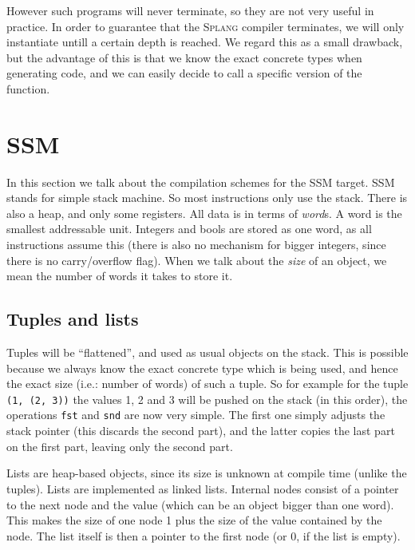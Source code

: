 \documentclass[14pt]{amsart}
\newcommand{\splang}{\textsc{Splang}\xspace}
\begin{document}
However such programs will never terminate, so they are not very useful in practice. In order to guarantee that the \splang compiler terminates, we will only instantiate untill a certain depth is reached. We regard this as a small drawback, but the advantage of this is that we know the exact concrete types when generating code, and we can easily decide to call a specific version of the function.

\section{SSM}

In this section we talk about the compilation schemes for the SSM target. SSM stands for simple stack machine. So most instructions only use the stack. There is also a heap, and only some registers. All data is in terms of \emph{word}s. A word is the smallest addressable unit. Integers and bools are stored as one word, as all instructions assume this (there is also no mechanism for bigger integers, since there is no carry/overflow flag).
When we talk about the \emph{size} of an object, we mean the number of words it takes to store it.

\subsection{Tuples and lists}
Tuples will be ``flattened'', and used as usual objects on the stack. This is possible because we always know the exact concrete type which is being used, and hence the exact size (i.e.: number of words) of such a tuple. So for example for the tuple \texttt{(1, (2, 3))} the values 1, 2 and 3 will be pushed on the stack (in this order), the operations \texttt{fst} and \texttt{snd} are now very simple. The first one simply adjusts the stack pointer (this discards the second part), and the latter copies the last part on the first part, leaving only the second part.

Lists are heap-based objects, since its size is unknown at compile time (unlike the tuples). Lists are implemented as linked lists. Internal nodes consist of a pointer to the next node and the value (which can be an object bigger than one word). This makes the size of one node 1 plus the size of the value contained by the node. The list itself is then a pointer to the first node (or 0, if the list is empty).
\end{document}
